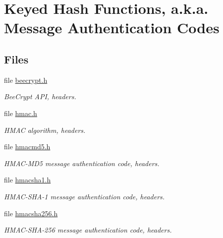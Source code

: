 \hypertarget{group__HMAC__m}{
\section{Keyed Hash Functions, a.k.a. Message Authentication Codes}
\label{group__HMAC__m}
}
\subsection*{Files}
\begin{CompactItemize}
\item 
file \hyperlink{beecrypt_8h}{beecrypt.h}
\begin{CompactList}\small\item\em Bee\-Crypt API, headers. \item\end{CompactList}

\item 
file \hyperlink{hmac_8h}{hmac.h}
\begin{CompactList}\small\item\em HMAC algorithm, headers. \item\end{CompactList}

\item 
file \hyperlink{hmacmd5_8h}{hmacmd5.h}
\begin{CompactList}\small\item\em HMAC-MD5 message authentication code, headers. \item\end{CompactList}

\item 
file \hyperlink{hmacsha1_8h}{hmacsha1.h}
\begin{CompactList}\small\item\em HMAC-SHA-1 message authentication code, headers. \item\end{CompactList}

\item 
file \hyperlink{hmacsha256_8h}{hmacsha256.h}
\begin{CompactList}\small\item\em HMAC-SHA-256 message authentication code, headers. \item\end{CompactList}

\end{CompactItemize}
